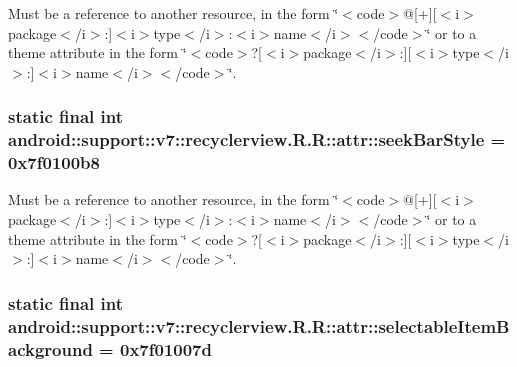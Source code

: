 Must be a reference to another resource, in the form \char`\"{}$<$code$>$@\mbox{[}+\mbox{]}\mbox{[}$<$i$>$package$<$/i$>$:\mbox{]}$<$i$>$type$<$/i$>$:$<$i$>$name$<$/i$>$$<$/code$>$\char`\"{} or to a theme attribute in the form \char`\"{}$<$code$>$?\mbox{[}$<$i$>$package$<$/i$>$:\mbox{]}\mbox{[}$<$i$>$type$<$/i$>$:\mbox{]}$<$i$>$name$<$/i$>$$<$/code$>$\char`\"{}. \hypertarget{classandroid_1_1support_1_1v7_1_1recyclerview_1_1_r_1_1attr_9e1790759a3003c462ca19078b6d4a2e}{
\subsubsection[{seekBarStyle}]{\setlength{\rightskip}{0pt plus 5cm}static final int android::support::v7::recyclerview.R.R::attr::seekBarStyle = 0x7f0100b8}}
\label{classandroid_1_1support_1_1v7_1_1recyclerview_1_1_r_1_1attr_9e1790759a3003c462ca19078b6d4a2e}


Must be a reference to another resource, in the form \char`\"{}$<$code$>$@\mbox{[}+\mbox{]}\mbox{[}$<$i$>$package$<$/i$>$:\mbox{]}$<$i$>$type$<$/i$>$:$<$i$>$name$<$/i$>$$<$/code$>$\char`\"{} or to a theme attribute in the form \char`\"{}$<$code$>$?\mbox{[}$<$i$>$package$<$/i$>$:\mbox{]}\mbox{[}$<$i$>$type$<$/i$>$:\mbox{]}$<$i$>$name$<$/i$>$$<$/code$>$\char`\"{}. \hypertarget{classandroid_1_1support_1_1v7_1_1recyclerview_1_1_r_1_1attr_4500d18728d238a4a3869b4920a7b149}{
\subsubsection[{selectableItemBackground}]{\setlength{\rightskip}{0pt plus 5cm}static final int android::support::v7::recyclerview.R.R::attr::selectableItemBackground = 0x7f01007d}}
\label{classandroid_1_1support_1_1v7_1_1recyclerview_1_1_r_1_1attr_4500d18728d238a4a3869b4920a7b149}


